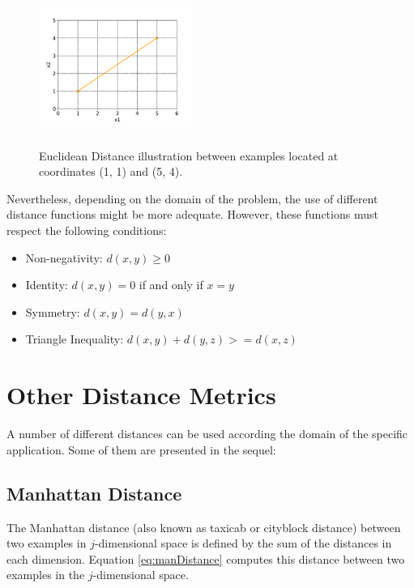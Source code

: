 \begin{figure}[h]
    \centering
    \includegraphics[height = 4.5cm, width =  5cm]{figures/EuclideanDistance2.png}
    \label{fig:EucDistance}
    \caption{Euclidean Distance illustration between examples located at coordinates (1, 1) and (5, 4).}
\end{figure}

Nevertheless, depending on the domain of the problem, the use of different distance functions might be more adequate. However, these functions must respect the following conditions:

\begin{itemize}
    \item Non-negativity: $d(x, y) \geq 0$
    \item Identity: $d(x, y) = 0$ if and only if $x = y$
    \item Symmetry: $d(x, y) = d(y, x)$    
    \item Triangle Inequality: $d(x, y) + d(y, z) >= d(x, z)$
\end{itemize} %

\section{Other Distance Metrics}

A number of different distances can be used according the domain of the specific application. Some of them are presented in the sequel:  

\subsection{Manhattan Distance}


The Manhattan distance \cite{Craw2010} (also known as taxicab or cityblock distance) between two examples in $j$-dimensional space is defined by the sum of the distances in each dimension. Equation \ref{eq:manDistance} computes this distance between two examples in the $j$-dimensional space.

